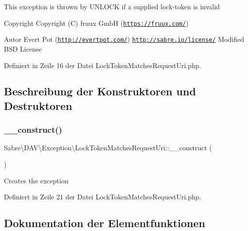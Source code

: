 This exception is thrown by U\+N\+L\+O\+CK if a supplied lock-\/token is invalid

\begin{DoxyCopyright}{Copyright}
Copyright (C) fruux GmbH (\href{https://fruux.com/}{\tt https\+://fruux.\+com/}) 
\end{DoxyCopyright}
\begin{DoxyAuthor}{Autor}
Evert Pot (\href{http://evertpot.com/}{\tt http\+://evertpot.\+com/})  \href{http://sabre.io/license/}{\tt http\+://sabre.\+io/license/} Modified B\+SD License 
\end{DoxyAuthor}


Definiert in Zeile 16 der Datei Lock\+Token\+Matches\+Request\+Uri.\+php.



\subsection{Beschreibung der Konstruktoren und Destruktoren}
\mbox{\label{class_sabre_1_1_d_a_v_1_1_exception_1_1_lock_token_matches_request_uri_a0931434ef8c854d3757cae9de32abfdf}} 
\subsubsection{\texorpdfstring{\+\_\+\+\_\+construct()}{\_\_construct()}}
{\footnotesize\ttfamily Sabre\textbackslash{}\+D\+A\+V\textbackslash{}\+Exception\textbackslash{}\+Lock\+Token\+Matches\+Request\+Uri\+::\+\_\+\+\_\+construct (\begin{DoxyParamCaption}{ }\end{DoxyParamCaption})}

Creates the exception 

Definiert in Zeile 21 der Datei Lock\+Token\+Matches\+Request\+Uri.\+php.



\subsection{Dokumentation der Elementfunktionen}
\mbox{\label{class_sabre_1_1_d_a_v_1_1_exception_1_1_lock_token_matches_request_uri_a73800cb52a61d6284cec5e0123530056}} 
